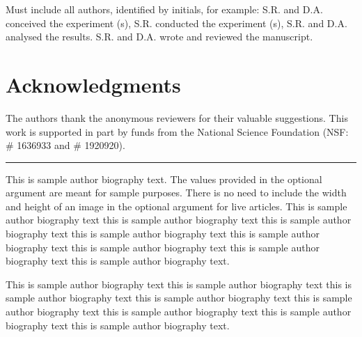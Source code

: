 \documentclass[unnumsec,webpdf,contemporary,large]{oup-authoring-template}%
\theoremstyle{thmstyleone}%
\theoremstyle{thmstyletwo}%
\theoremstyle{thmstylethree}%
\begin{document}
Must include all authors, identified by initials, for example: S.R. and D.A.
conceived the experiment (s),  S.R. conducted the experiment (s), S.R. and D.A.
analysed the results.  S.R. and D.A. wrote and reviewed the manuscript.

\section{Acknowledgments}
The authors thank the anonymous reviewers for their valuable suggestions. This
work is supported in part by funds from the National Science Foundation (NSF:\@
\# 1636933 and \# 1920920).





% 


\begin{biography}{{\color{black!20}\rule{77pt}{77pt}}}{\author{Author Name.}
This is sample author biography text. The values provided in the optional
argument are meant for sample purposes. There is no need to include the width
and height of an image in the optional argument for live articles. This is
sample author biography text this is sample author biography text this is sample
author biography text this is sample author biography text this is sample author
biography text this is sample author biography text this is sample author
biography text this is sample author biography text.}
\end{biography}

\begin{biography}{}{\author{Author Name.} This is sample author biography text
this is sample author biography text this is sample author biography text this
is sample author biography text this is sample author biography text this is
sample author biography text this is sample author biography text this is sample
author biography text.}
\end{biography}
\end{document}
